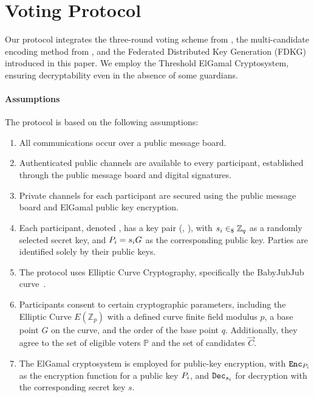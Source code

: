 \documentclass[runningheads]{llncs}
\begin{document}
\newcommand{\G}{\ensuremath{G}}


\newcommand{\SharePartialDecryptionFromTo}[2]{\ensuremath{[\mathrm{PD}_{#1}]_{#2}}}

\newcommand{\PartialDecryptionFrom}[1]{\ensuremath{\mathrm{PD}_{#1}}}
\section{Voting Protocol}

Our protocol integrates the three-round voting scheme from \cite{schoenmakersLectureNotesCryptographic2018}, the multi-candidate encoding method from \cite{haoAnonymousVotingTworound2010}, and the Federated Distributed Key Generation (FDKG) introduced in this paper. We employ the Threshold ElGamal Cryptosystem, ensuring decryptability even in the absence of some guardians.

\paragraph*{Assumptions}
The protocol is based on the following assumptions:
\begin{enumerate}
\item All communications occur over a public message board.
\item Authenticated public channels are available to every participant, established through the public message board and digital signatures.
\item Private channels for each participant are secured using the public message board and ElGamal public key encryption.
\item Each participant, denoted , has a key pair (, ), with $s_{i} \in_\$ \mathbb{Z}_q$ as a randomly selected secret key, and $\Party{i} = \PartySecretKey{i} \G$ as the corresponding public key. Parties are identified solely by their public keys.
\item The protocol uses Elliptic Curve Cryptography, specifically the BabyJubJub curve~\cite{whitehatBabyJubjubElliptic2020}.
\item Participants consent to certain cryptographic parameters, including the Elliptic Curve $E(\mathbb{Z}_p)$ with a defined curve finite field modulus $p$, a base point $G$ on the curve, and the order of the base point $q$. Additionally, they agree to the set of eligible voters $\mathbb{P}$ and the set of candidates $\vec{C}$.
\item The ElGamal cryptosystem is employed for public-key encryption, with $\texttt{Enc}_{P_{i}}$ as the encryption function for a public key $P_{i}$, and $\texttt{Dec}_{s_{i}}$ for decryption with the corresponding secret key $s$.
\end{enumerate}
\end{document}
